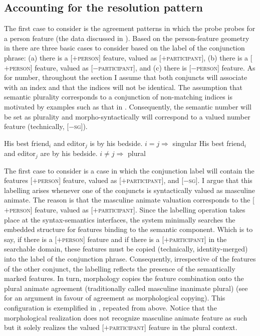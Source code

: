 \documentclass[output=paper,
modfonts
newtxmath,
hidelinks
]{langscibook}
\begin{document}
\subsection{Accounting for the resolution pattern}

The first case to consider is the agreement patterns in which the probe probes for a person feature (the data discussed in ). Based on the person-feature geometry in  there are three basic cases to consider based on the label of the conjunction phrase: (a) there is a [$+$\textsc{person}] feature, valued as [$+$\textsc{participant}], (b) there is a [$+$\textsc{person}] feature, valued as [$-$\textsc{participant}], and (c) there is [$-$\textsc{person}] feature. As for number, throughout the section I assume that both conjuncts will associate with an index and that the indices will not be identical. The assumption that semantic plurality corresponds to a conjunction of non-matching indices is motivated by examples such as that in . Consequently, the semantic number will be set as plurality and morpho-syntactically will correspond to a valued number feature (technically, [$-$\textsc{sg}]).

\ea\label{plural}
\ea His best friend$_i$ and editor$_j$ is by his bedside. \hfill $i=j \Rightarrow$ singular
\ex His best friend$_i$ and editor$_j$ are by his bedside. \hfill $i \neq j \Rightarrow$ plural 
\z\z

\largerpage
\noindent The first case to consider is a case in which the conjunction label will contain the features [$+$\textsc{person}] feature, valued as [$+$\textsc{participant}], and [$-$\textsc{sg}]. I argue that this labelling arises whenever one of the conjuncts is syntactically valued as masculine animate. The reason is that the masculine animate valuation corresponds to the  [$+$\textsc{person}] feature, valued as [$+$\textsc{participant}]. Since the labelling operation takes place at the syntax-semantics interfaces, the system minimally searches the embedded structure for features binding to the semantic component. Which is to say, if there is a [$+$\textsc{person}] feature and if there is a [$+$\textsc{participant}] in the searchable domain, these features must be copied (technically, identity-merged) into the label of the conjunction phrase. Consequently, irrespective of the features of the other conjunct, the labelling reflects the presence of the semantically marked features. In turn, morphology copies the feature combination onto the plural animate agreement (traditionally called masculine inanimate plural) (see \citealt{Bhatt2013} for an argument in favour of agreement as morphological copying). This configuration is exemplified in , repeated from  above. Notice that the morphological realization does not recognize masculine animate feature as such but it solely realizes the valued [$+$\textsc{participant}] feature in the plural context.
\end{document}
